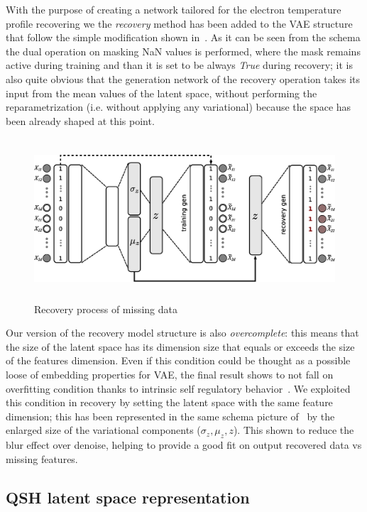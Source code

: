 With the purpose of creating a network tailored for the electron temperature profile recovering we the \textit{recovery} method has been added to the VAE structure that follow the simple modification shown in~\Figure{\ref{fig:VAE_recovery}}.
As it can be seen from the schema the dual operation on masking NaN values is performed, where the mask remains active during training and than it is set to be always \textit{True} during recovery; it is also quite obvious that the generation network of the recovery operation takes its input from the mean values of the latent space, without performing the reparametrization (i.e. without applying any variational) because the space has been already shaped at this point.
%
\begin{figure}
    \centering
    \includegraphics[height=6cm]{img/STEP7_CLEAN/VAE_CLEAN.eps}
    \caption{Recovery process of missing data}
    \label{fig:VAE_recovery}
\end{figure}
%
Our version of the recovery model structure is also \textit{overcomplete}: this means that the size of the latent space has its dimension size that equals or exceeds the size of the features dimension. Even if this condition could be thought as a possible loose of embedding properties for VAE, the final result shows to not fall on overfitting condition thanks to intrinsic self regulatory behavior~\cite{dai2017hidden}. We exploited this condition in recovery by setting the latent space with the same feature dimension; this has been represented in the same schema picture of~\Figure{\ref{fig:VAE_recovery}} by the enlarged size of the variational components ($\sigma_z, \mu_z, z$). This shown to reduce the blur effect over denoise, helping to provide a good fit on output recovered data vs missing features.



\subsection{QSH latent space representation}

